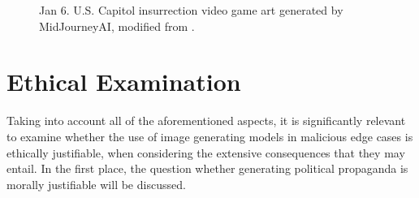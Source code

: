\documentclass[10pt,twocolumn,twoside]{osajnl}
\begin{document}
\begin{figure}[htbp]
	\centering
	\caption{Jan 6. U.S. Capitol insurrection video game art generated by MidJourneyAI, modified from \cite{AIPropaganda}.}
	\label{capitol}
\end{figure}

\section{Ethical Examination}
Taking into account all of the aforementioned aspects, it is significantly relevant to examine whether the use of image generating models in malicious edge cases is ethically justifiable, when considering the extensive consequences
that they may entail. In the first place, the question whether generating political propaganda is morally justifiable will be discussed. 
\\
\end{document}
